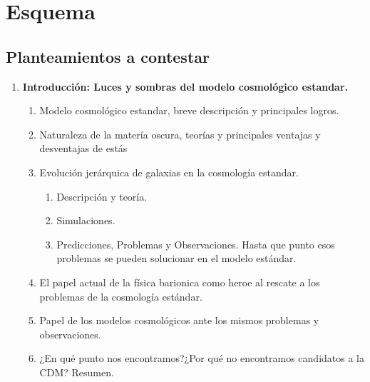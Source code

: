 
\chapter{Esquema} %

\label{indice} %


\section*{Planteamientos a contestar}
\begin{enumerate}
	\item \textbf{Introducción: Luces y sombras del modelo cosmológico estandar.}
	\begin{enumerate}[{1.}1]
		\item Modelo cosmológico estandar, breve descripción y principales logros.
		\item Naturaleza de la matería oscura, teorías y principales ventajas y desventajas de estás
		\item Evolución jerárquica de galaxias en la cosmología estandar.
		\begin{enumerate}[{1.3.}1]
			\item Descripción y teoría.
			\item Simulaciones.
			\item Predicciones, Problemas y Observaciones. Hasta que punto esos problemas se pueden solucionar en el modelo estándar.
		\end{enumerate}
		\item El papel actual de la física barionica como heroe al rescate a los problemas de la cosmología estándar.
		\item Papel de los modelos cosmológicos ante los mismos problemas y observaciones.
		\item ¿En qué punto nos encontramos?¿Por qué no encontramos candidatos a la CDM? Resumen.
	\end{enumerate}


\end{enumerate}
